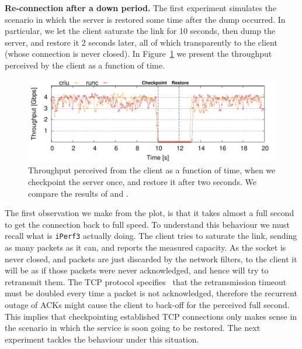 \textbf{Re-connection after a down period.}
The first experiment simulates the scenario in which the server is restored some time after the dump occurred.
In particular, we let the client saturate the link for 10 seconds, then dump the server, and restore it 2 seconds later, all of which transparently to the client (whose connection is never closed).
In Figure~\ref{fig:evaluation-downtime} we present the throughput perceived by the client as a function of time. 
\begin{figure}[h!]
    \centering
    \includegraphics[width=\linewidth]{./figs/tcp-established-downtime/tcp_established_downtime_microbenchmark.pdf}
    \caption{Throughput perceived from the client as a function of time, when we checkpoint the server once, and restore it after two seconds. We compare the results of \criu and \runc. \label{fig:evaluation-downtime}}
\end{figure}
The first observation we make from the plot, is that it takes almost a full second to get the connection back to full speed.
To understand this behaviour we must recall what is \texttt{iPerf3} actually doing.
The client tries to saturate the link, sending as many packets as it can, and reports the measured capacity.
As the socket is never closed, and packets are just discarded by the network filters, to the client it will be as if those packets were never acknowledged, and hence will try to retransmit them.
The TCP protocol specifies~\cite{tcp-rfc} that the retransmission timeout must be doubled every time a packet is not acknowledged, therefore the recurrent outage of ACKs might cause the client to back-off for the perceived full second.
This implies that checkpointing established TCP connections only makes sense in the scenario in which the service is soon going to be restored.
The next experiment tackles the behaviour under this situation.

